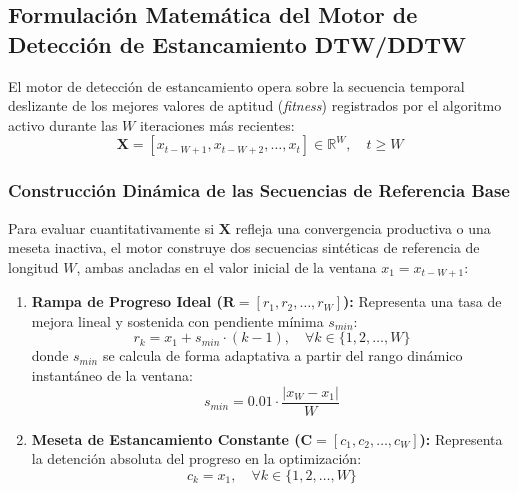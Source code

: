\subsection{Formulación Matemática del Motor de Detección de Estancamiento DTW/DDTW}
\label{sec:dtw_formulation}

El motor de detección de estancamiento opera sobre la secuencia temporal deslizante de los mejores valores de aptitud (\textit{fitness}) registrados por el algoritmo activo durante las $W$ iteraciones más recientes:
\begin{equation}
\mathbf{X} = \left[ x_{t-W+1}, x_{t-W+2}, \dots, x_t \right] \in \mathbb{R}^W, \quad t \ge W
\label{eq:sliding_window}
\end{equation}

\subsubsection{Construcción Dinámica de las Secuencias de Referencia Base}

Para evaluar cuantitativamente si $\mathbf{X}$ refleja una convergencia productiva o una meseta inactiva, el motor construye dos secuencias sintéticas de referencia de longitud $W$, ambas ancladas en el valor inicial de la ventana $x_1 = x_{t-W+1}$:

\begin{enumerate}
    \item \textbf{Rampa de Progreso Ideal ($\mathbf{R} = [r_1, r_2, \dots, r_W]$):} Representa una tasa de mejora lineal y sostenida con pendiente mínima $s_{min}$:
    \begin{equation}
    r_k = x_1 + s_{min} \cdot (k - 1), \quad \forall k \in \{1, 2, \dots, W\}
    \label{eq:ramp_baseline}
    \end{equation}
    donde $s_{min}$ se calcula de forma adaptativa a partir del rango dinámico instantáneo de la ventana:
    \begin{equation}
    s_{min} = 0.01 \cdot \frac{|x_W - x_1|}{W}
    \label{eq:adaptive_slope}
    \end{equation}

    \item \textbf{Meseta de Estancamiento Constante ($\mathbf{C} = [c_1, c_2, \dots, c_W]$):} Representa la detención absoluta del progreso en la optimización:
    \begin{equation}
    c_k = x_1, \quad \forall k \in \{1, 2, \dots, W\}
    \label{eq:constant_baseline}
    \end{equation}
\end{enumerate}

